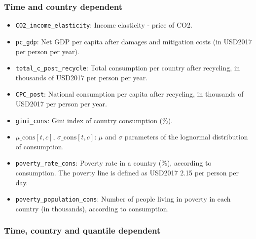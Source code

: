\documentclass[
]{article}
\providecommand{\tightlist}{%
  \setlength{\itemsep}{0pt}\setlength{\parskip}{0pt}}
\begin{document}
\subsubsection{Time and country
dependent}\label{time-and-country-dependent-11}

\begin{itemize}
\tightlist
\item
  \texttt{CO2\_income\_elasticity}: Income elasticity - price of CO2.
\item
  \texttt{pc\_gdp}: Net GDP per capita after damages and mitigation
  costs (in USD2017 per person per year).
\item
  \texttt{total\_c\_post\_recycle}: Total consumption per country after
  recycling, in thousands of USD2017 per person per year.
\item
  \texttt{CPC\_post}: National consumption per capita after recycling, in thousands of USD2017 per person per year.
\item
  \texttt{gini\_cons}: Gini index of country consumption (\%).
\item
\texttt{$\mu\_{\text{cons}}[t,c]$}, \texttt{$\sigma\_{\text{cons}}[t,c]$}: $\mu$ and $\sigma$ parameters of
  the lognormal distribution of consumption.
\item
  \texttt{poverty\_rate\_cons}: Poverty rate in a country (\%),
  according to consumption. The poverty line is defined as USD2017 2.15
  per person per day.
\item
  \texttt{poverty\_population\_cons}: Number of people living in poverty
  in each country (in thousands), according to consumption.
\end{itemize}

\subsubsection{Time, country and quantile
dependent}\label{time-country-and-quantile-dependent}
\end{document}
